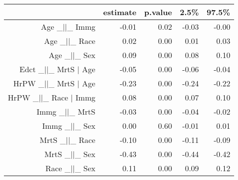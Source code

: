 \begin{table}[ht]
\centering
\begin{tabular}{rrrrr}
  \hline
 & estimate & p.value & 2.5\% & 97.5\% \\ 
  \hline
Age \_$|$$|$\_ Immg & -0.01 & 0.02 & -0.03 & -0.00 \\ 
  Age \_$|$$|$\_ Race & 0.02 & 0.00 & 0.01 & 0.03 \\ 
  Age \_$|$$|$\_ Sex & 0.09 & 0.00 & 0.08 & 0.10 \\ 
  Edct \_$|$$|$\_ MrtS $|$ Age & -0.05 & 0.00 & -0.06 & -0.04 \\ 
  HrPW \_$|$$|$\_ MrtS $|$ Age & -0.23 & 0.00 & -0.24 & -0.22 \\ 
  HrPW \_$|$$|$\_ Race $|$ Immg & 0.08 & 0.00 & 0.07 & 0.10 \\ 
  Immg \_$|$$|$\_ MrtS & -0.03 & 0.00 & -0.04 & -0.02 \\ 
  Immg \_$|$$|$\_ Sex & 0.00 & 0.60 & -0.01 & 0.01 \\ 
  MrtS \_$|$$|$\_ Race & -0.10 & 0.00 & -0.11 & -0.09 \\ 
  MrtS \_$|$$|$\_ Sex & -0.43 & 0.00 & -0.44 & -0.42 \\ 
  Race \_$|$$|$\_ Sex & 0.11 & 0.00 & 0.09 & 0.12 \\ 
   \hline
\end{tabular}
\end{table}
